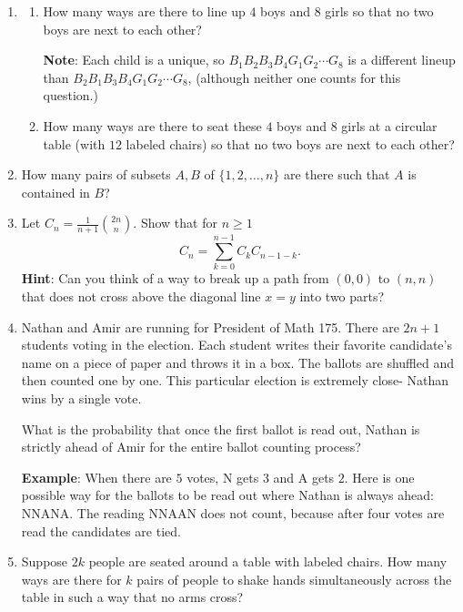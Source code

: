 \documentclass[11pt]{article}
\begin{document}
\newpage


\begin{enumerate}

\item 
\begin{enumerate}
\item How many ways are there to line up $4$ boys and $8$ girls so that no two boys are next to each other?  

{\bf Note}: Each child is a unique, so $B_1 B_2 B_3 B_4 G_1 G_2 \cdots G_8$ is a different lineup than $B_2 B_1 B_3 B_4 G_1 G_2 \cdots G_8$, (although neither one counts for this question.)

\item How many ways are there to seat these $4$ boys and $8$ girls at a circular table (with $12$ labeled chairs) so that no two boys are next to each other?
\end{enumerate}

\item How many pairs of subsets $A, B$ of $\{1,2,\ldots, n\}$ are there such that $A$ is contained in $B$?

\item Let $C_n = \frac{1}{n+1} \binom{2n}{n}$.  Show that for $n\ge 1$
\[
C_n = \sum_{k=0}^{n-1} C_k C_{n-1-k}.
\]
{\bf Hint}: Can you think of a way to break up a path from $(0,0)$ to $(n,n)$ that does not cross above the diagonal line $x=y$ into two parts?

\item Nathan and Amir are running for President of Math 175.  There are $2n+1$ students voting in the election.  Each student writes their favorite candidate's name on a piece of paper and throws it in a box.  The ballots are shuffled and then counted one by one.  This particular election is extremely close- Nathan wins by a single vote.

What is the probability that once the first ballot is read out, Nathan is strictly ahead of Amir for the entire ballot counting process?

{\bf Example}: When there are $5$ votes, N gets $3$ and A gets $2$.  Here is one possible way for the ballots to be read out where Nathan is always ahead: NNANA.  The reading NNAAN does not count, because after four votes are read the candidates are tied.

\item Suppose $2k$ people are seated around a table with labeled chairs.  How many ways are there for $k$ pairs of people to shake hands simultaneously across the table in such a way that no arms cross?


\end{enumerate}
\end{document}
